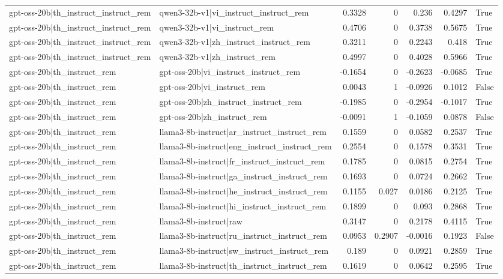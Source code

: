 \begin{table}
\begin{tabular}{l l r r r r l}
gpt-oss-20b|th_instruct_instruct_rem & qwen3-32b-v1|vi_instruct_instruct_rem & 0.3328 & 0 & 0.236 & 0.4297 & True \\
gpt-oss-20b|th_instruct_instruct_rem & qwen3-32b-v1|vi_instruct_rem & 0.4706 & 0 & 0.3738 & 0.5675 & True \\
gpt-oss-20b|th_instruct_instruct_rem & qwen3-32b-v1|zh_instruct_instruct_rem & 0.3211 & 0 & 0.2243 & 0.418 & True \\
gpt-oss-20b|th_instruct_instruct_rem & qwen3-32b-v1|zh_instruct_rem & 0.4997 & 0 & 0.4028 & 0.5966 & True \\
gpt-oss-20b|th_instruct_rem & gpt-oss-20b|vi_instruct_instruct_rem & -0.1654 & 0 & -0.2623 & -0.0685 & True \\
gpt-oss-20b|th_instruct_rem & gpt-oss-20b|vi_instruct_rem & 0.0043 & 1 & -0.0926 & 0.1012 & False \\
gpt-oss-20b|th_instruct_rem & gpt-oss-20b|zh_instruct_instruct_rem & -0.1985 & 0 & -0.2954 & -0.1017 & True \\
gpt-oss-20b|th_instruct_rem & gpt-oss-20b|zh_instruct_rem & -0.0091 & 1 & -0.1059 & 0.0878 & False \\
gpt-oss-20b|th_instruct_rem & llama3-8b-instruct|ar_instruct_instruct_rem & 0.1559 & 0 & 0.0582 & 0.2537 & True \\
gpt-oss-20b|th_instruct_rem & llama3-8b-instruct|eng_instruct_instruct_rem & 0.2554 & 0 & 0.1578 & 0.3531 & True \\
gpt-oss-20b|th_instruct_rem & llama3-8b-instruct|fr_instruct_instruct_rem & 0.1785 & 0 & 0.0815 & 0.2754 & True \\
gpt-oss-20b|th_instruct_rem & llama3-8b-instruct|ga_instruct_instruct_rem & 0.1693 & 0 & 0.0724 & 0.2662 & True \\
gpt-oss-20b|th_instruct_rem & llama3-8b-instruct|he_instruct_instruct_rem & 0.1155 & 0.027 & 0.0186 & 0.2125 & True \\
gpt-oss-20b|th_instruct_rem & llama3-8b-instruct|hi_instruct_instruct_rem & 0.1899 & 0 & 0.093 & 0.2868 & True \\
gpt-oss-20b|th_instruct_rem & llama3-8b-instruct|raw & 0.3147 & 0 & 0.2178 & 0.4115 & True \\
gpt-oss-20b|th_instruct_rem & llama3-8b-instruct|ru_instruct_instruct_rem & 0.0953 & 0.2907 & -0.0016 & 0.1923 & False \\
gpt-oss-20b|th_instruct_rem & llama3-8b-instruct|sw_instruct_instruct_rem & 0.189 & 0 & 0.0921 & 0.2859 & True \\
gpt-oss-20b|th_instruct_rem & llama3-8b-instruct|th_instruct_instruct_rem & 0.1619 & 0 & 0.0642 & 0.2595 & True \\

\end{tabular}
\end{table}
